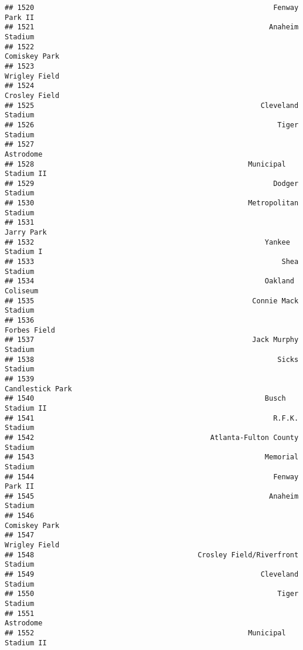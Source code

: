 \documentclass[]{article}
\begin{document}
\begin{verbatim}
## 1520                                                         Fenway Park II
## 1521                                                        Anaheim Stadium
## 1522                                                          Comiskey Park
## 1523                                                          Wrigley Field
## 1524                                                          Crosley Field
## 1525                                                      Cleveland Stadium
## 1526                                                          Tiger Stadium
## 1527                                                              Astrodome
## 1528                                                   Municipal Stadium II
## 1529                                                         Dodger Stadium
## 1530                                                   Metropolitan Stadium
## 1531                                                             Jarry Park
## 1532                                                       Yankee Stadium I
## 1533                                                           Shea Stadium
## 1534                                                       Oakland Coliseum
## 1535                                                    Connie Mack Stadium
## 1536                                                           Forbes Field
## 1537                                                    Jack Murphy Stadium
## 1538                                                          Sicks Stadium
## 1539                                                       Candlestick Park
## 1540                                                       Busch Stadium II
## 1541                                                         R.F.K. Stadium
## 1542                                          Atlanta-Fulton County Stadium
## 1543                                                       Memorial Stadium
## 1544                                                         Fenway Park II
## 1545                                                        Anaheim Stadium
## 1546                                                          Comiskey Park
## 1547                                                          Wrigley Field
## 1548                                       Crosley Field/Riverfront Stadium
## 1549                                                      Cleveland Stadium
## 1550                                                          Tiger Stadium
## 1551                                                              Astrodome
## 1552                                                   Municipal Stadium II

\end{verbatim}
\end{document}
